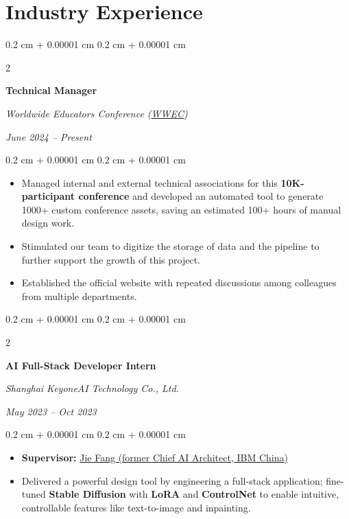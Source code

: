 \documentclass[10pt, letterpaper]{article}
\newenvironment{highlights}{
    \begin{itemize}[
        topsep=0.05 cm,
        parsep=0.05 cm,
        partopsep=0pt,
        itemsep=0pt,
        leftmargin=0.4 cm + 10pt
    ]
}{
    \end{itemize}
} %
\newenvironment{onecolentry}{
    \begin{adjustwidth}{
        0.2 cm + 0.00001 cm
    }{
        0.2 cm + 0.00001 cm
    }
}{
    \end{adjustwidth}
} %
\newenvironment{twocolentry}[2][]{
    \onecolentry
    \def\secondColumn{#2}
    \setcolumnwidth{\fill, 4.5 cm}
    \begin{paracol}{2}
}{
    \switchcolumn \raggedleft \secondColumn
    \end{paracol}
    \endonecolentry
} %
\begin{document}
\section{Industry Experience}
    \begin{twocolentry}{
        \textit{June 2024 – Present}
    }
        \textbf{Technical Manager}
        
        \textit{Worldwide Educators Conference (\href{https://www.wwec820.com/}{WWEC})}
        
    \end{twocolentry}
    \begin{onecolentry}
        \begin{highlights}
            \item Managed internal and external technical associations for this \textbf{10K-participant conference} and developed an automated tool to generate 1000+ custom conference assets, saving an estimated 100+ hours of manual design work.
            \item Stimulated our team to digitize the storage of data and the pipeline to further support the growth of this project.
            \item Established the official website with repeated discussions among colleagues from multiple departments. \href{https://www.wwec820.com}{\faLink}
        \end{highlights}
    \end{onecolentry}

    \vspace{0.1cm}

    \begin{twocolentry}{
        \textit{May 2023 – Oct 2023}
    }
        \textbf{AI Full-Stack Developer Intern}
        
        \textit{Shanghai KeyoneAI Technology Co., Ltd.}
    \end{twocolentry}
    \begin{onecolentry}
        \begin{highlights}
            \item \textbf{Supervisor:} \href{https://www.linkedin.com/in/jie-fang-28293740}{Jie Fang (former Chief AI Architect, IBM China)}
            \item Delivered a powerful design tool by engineering a full-stack application; fine-tuned \textbf{Stable Diffusion} with \textbf{LoRA} and \textbf{ControlNet} to enable intuitive, controllable features like text-to-image and inpainting.
               \end{highlights}
    \end{onecolentry}
\end{document}
